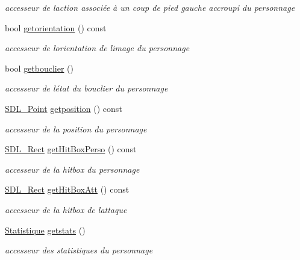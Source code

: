 \begin{DoxyCompactItemize}
\begin{DoxyCompactList}\small\item\em accesseur de l\textquotesingle{}action associée à un coup de pied gauche accroupi du personnage \end{DoxyCompactList}\item 
bool \hyperlink{class_personnage_a5fc5f92a5361fc5b93e8e176331eab3c}{getorientation} () const
\begin{DoxyCompactList}\small\item\em accesseur de l\textquotesingle{}orientation de l\textquotesingle{}image du personnage \end{DoxyCompactList}\item 
bool \hyperlink{class_personnage_a98ae46585df4974b6839b6a6e63b9ae9}{getbouclier} ()
\begin{DoxyCompactList}\small\item\em accesseur de l\textquotesingle{}état du bouclier du personnage \end{DoxyCompactList}\item 
\hyperlink{struct_s_d_l___point}{S\+D\+L\+\_\+\+Point} \hyperlink{class_personnage_ae3d90b3d06aad9e158dfb32a0082eb46}{getposition} () const
\begin{DoxyCompactList}\small\item\em accesseur de la position du personnage \end{DoxyCompactList}\item 
\hyperlink{struct_s_d_l___rect}{S\+D\+L\+\_\+\+Rect} \hyperlink{class_personnage_afee72d7981842c259a090260b69a474e}{get\+Hit\+Box\+Perso} () const
\begin{DoxyCompactList}\small\item\em accesseur de la hitbox du personnage \end{DoxyCompactList}\item 
\hyperlink{struct_s_d_l___rect}{S\+D\+L\+\_\+\+Rect} \hyperlink{class_personnage_af147a08524f03a17a43a6c6cbb36e7b5}{get\+Hit\+Box\+Att} () const
\begin{DoxyCompactList}\small\item\em accesseur de la hitbox de l\textquotesingle{}attaque \end{DoxyCompactList}\item 
\hyperlink{class_statistique}{Statistique} \hyperlink{class_personnage_a972889d9844a547432c2ccd880d13d30}{getstats} ()
\begin{DoxyCompactList}\small\item\em accesseur des statistiques du personnage \end{DoxyCompactList}\item 

\end{DoxyCompactItemize}
